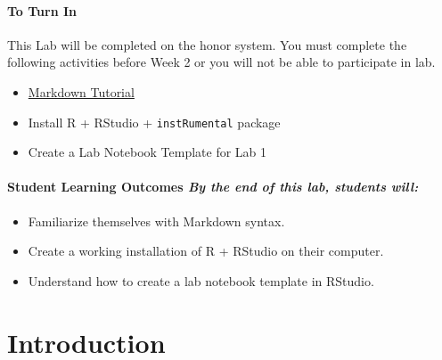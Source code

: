 \documentclass[]{tufte-book}
\providecommand{\tightlist}{%
  \setlength{\itemsep}{0pt}\setlength{\parskip}{0pt}}
\begin{document}
\hypertarget{to-turn-in}{%
\paragraph{\texorpdfstring{\textbf{To Turn In}}{To Turn In}}\label{to-turn-in}}

This Lab will be completed on the honor system. You must complete the following activities before Week 2 or you will not be able to participate in lab.

\begin{itemize}
\tightlist
\item
  \href{https://www.markdowntutorial.com/}{Markdown Tutorial}
\item
  Install R + RStudio + \texttt{instRumental} package
\item
  Create a Lab Notebook Template for Lab 1
\end{itemize}

\hypertarget{student-learning-outcomes-by-the-end-of-this-lab-students-will}{%
\paragraph{\texorpdfstring{\textbf{Student Learning Outcomes} \textbar{} \emph{By the end of this lab, students will:}}{Student Learning Outcomes \textbar{} By the end of this lab, students will:}}\label{student-learning-outcomes-by-the-end-of-this-lab-students-will}}

\begin{itemize}
\tightlist
\item
  Familiarize themselves with Markdown syntax.
\item
  Create a working installation of R + RStudio on their computer.
\item
  Understand how to create a lab notebook template in RStudio.
\end{itemize}

\hypertarget{r-intro}{%
\section*{Introduction}\label{r-intro}}
\end{document}
